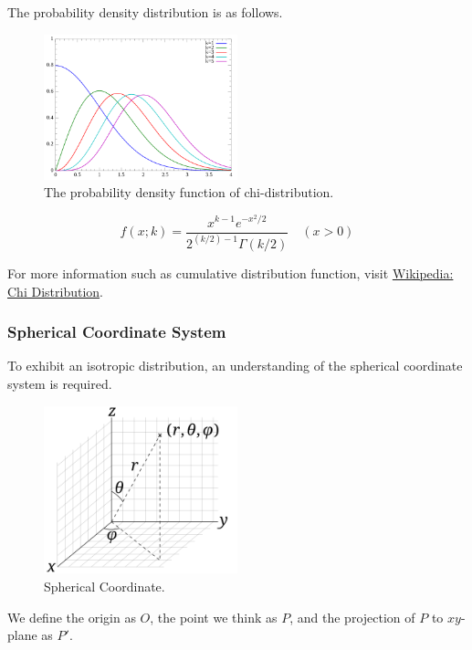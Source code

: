 The probability density distribution is as follows.

\begin{figure}[h]
\centering
\includegraphics[width=0.5\textwidth]{figs/chi.png}
\caption{The probability density function of chi-distribution.}
\end{figure}

\begin{equation}
    f(x;k) = \frac{x^{k-1} e^{-x^2/2}}{2^{(k/2) - 1} \Gamma(k/2)} \quad (x>0)
\end{equation}

For more information such as cumulative distribution function, visit \href{https://en.wikipedia.org/wiki/Chi_distribution}{Wikipedia: Chi Distribution}.

\subsubsection{Spherical Coordinate System}

To exhibit an isotropic distribution, an understanding of the spherical coordinate system is required.

\begin{figure}[h]
\centering
\includegraphics[width=0.5\textwidth]{figs/sphe.png}
\caption{Spherical Coordinate.}
\end{figure}

We define the origin as $O$, the point we think as $P$, and the projection of $P$ to $xy$-plane as $P'$.

